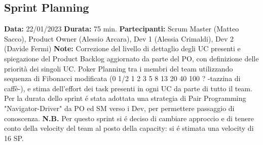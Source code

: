 \documentclass{article}
\begin{document}
    \subsection{Sprint Planning}
    \textbf{Data:} 22/01/2023
    \newline \textbf{Durata:} 75 min.
    \newline \textbf{Partecipanti:} Scrum Master (Matteo Sacco), Product Owner (Alessio Arcara), Dev 1 (Alessia Crimaldi), Dev 2 (Davide Fermi)
    \newline \textbf{Note:} Correzione del livello di dettaglio degli UC presenti e spiegazione del Product Backlog aggiornato da parte del PO, con definizione delle priorità dei singoli UC. Poker Planning tra i membri del team utilizzando sequenza di Fibonacci modificata (0  1/2  1  2  3  5  8  13  20  40  100  ?  -tazzina di caffè-), e stima dell'effort dei task presenti in ogni UC da parte di tutto il team.
    \newline Per la durata dello sprint \'e stata adottata una strategia di Pair Programming "Navigator-Driver" da PO ed SM verso i Dev, per permettere passaggio di conoscenza.
    \newline \textbf{N.B. } Per questo sprint si \'e deciso di cambiare approccio e di tenere conto della velocity del team al posto della capacity: si \'e stimata una velocity di 16 SP.

    \newpage
\end{document}
